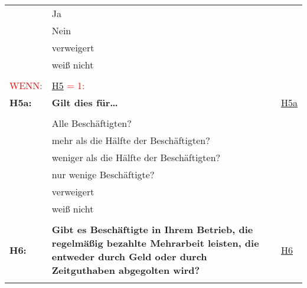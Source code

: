 \begin{longtable}{!{\color{black}\vline width 1pt}  L{2cm}!{\color{black}\vline width 1pt} L{12.25cm}!{\color{black}\vline width 1pt}  L{2.5cm}!{\color{black}\vline width 1pt}}
   & Ja &  \\ 
   & Nein &  \\ 
   & verweigert &  \\ 
   & weiß nicht &  \\ 
   &  &  \\ 
   \midrule
{}\textcolor{red}{WENN:} & \textcolor{red}{ \hyperref[H5]{H5} = 1: } &  \\ 
  \textbf{H5a:}\label{H5a} & \textbf{Gilt dies für…} & \hyperref[var:H5a]{H5a} \\ 
   &  &  \\ 
   & Alle Beschäftigten? &  \\ 
   & mehr als die Hälfte der Beschäftigten? &  \\ 
   & weniger als die Hälfte der Beschäftigten? &  \\ 
   & nur wenige Beschäftigte? &  \\ 
   & verweigert &  \\ 
   & weiß nicht &  \\ 
   &  &  \\ 
   \midrule
{}\textbf{H6:}\label{H6} & \textbf{Gibt es Beschäftigte in Ihrem Betrieb, die regelmäßig bezahlte Mehrarbeit leisten, die entweder durch Geld oder durch Zeitguthaben abgegolten wird?} & \hyperref[var:H6]{H6} \\ 
   &  &  \\ 

\end{longtable}
